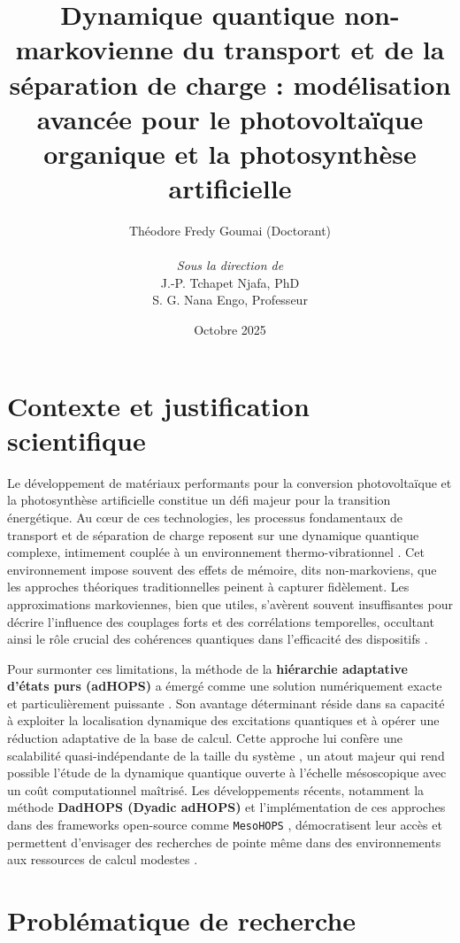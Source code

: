 \documentclass[12pt, a4paper]{article}
\title{\huge Dynamique quantique non-markovienne du transport et de la séparation de charge : modélisation avancée pour le photovoltaïque organique et la photosynthèse artificielle}
\author{
    Théodore Fredy Goumai (Doctorant) \\
    \\
    \textit{Sous la direction de} \\
    J.-P. Tchapet Njafa, PhD \\
    S. G. Nana Engo, Professeur
}
\date{Octobre 2025}
\begin{document}
\maketitle
\thispagestyle{empty} %
\newpage

\tableofcontents %
\newpage
\setcounter{page}{1} %


\section{Contexte et justification scientifique}

Le développement de matériaux performants pour la conversion photovoltaïque et la photosynthèse artificielle constitue un défi majeur pour la transition énergétique. Au cœur de ces technologies, les processus fondamentaux de transport et de séparation de charge reposent sur une dynamique quantique complexe, intimement couplée à un environnement thermo-vibrationnel \cite{ye2012, mohs2008}. Cet environnement impose souvent des effets de mémoire, dits non-markoviens, que les approches théoriques traditionnelles peinent à capturer fidèlement. Les approximations markoviennes, bien que utiles, s'avèrent souvent insuffisantes pour décrire l'influence des couplages forts et des corrélations temporelles, occultant ainsi le rôle crucial des cohérences quantiques dans l'efficacité des dispositifs \cite{tao2020, dijkstra2010}.

Pour surmonter ces limitations, la méthode de la \textbf{hiérarchie adaptative d'états purs (adHOPS)} a émergé comme une solution numériquement exacte et particulièrement puissante \cite{Suess2014}. Son avantage déterminant réside dans sa capacité à exploiter la localisation dynamique des excitations quantiques et à opérer une réduction adaptative de la base de calcul. Cette approche lui confère une scalabilité quasi-indépendante de la taille du système \cite{varvelo2021}, un atout majeur qui rend possible l'étude de la dynamique quantique ouverte à l'échelle mésoscopique avec un coût computationnel maîtrisé. Les développements récents, notamment la méthode \textbf{DadHOPS (Dyadic adHOPS)} \cite{Gera2023, Chen2022a} et l'implémentation de ces approches dans des frameworks open-source comme \texttt{MesoHOPS} \cite{Citty2024}, démocratisent leur accès et permettent d'envisager des recherches de pointe même dans des environnements aux ressources de calcul modestes \cite{johansson2012}.

\section{Problématique de recherche}
\end{document}
